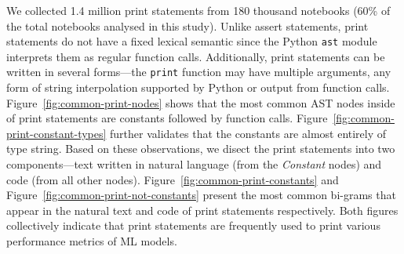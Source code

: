 We collected 1.4 million print statements from 180 thousand notebooks (60\% of the total notebooks analysed in this study). Unlike assert statements, print statements do not have a fixed lexical semantic since the Python \lstinline{ast} module interprets them as regular function calls. Additionally, print statements can be written in several forms---the \lstinline{print} function may have multiple arguments, any form of string interpolation supported by Python or output from function calls. Figure~\ref{fig:common-print-nodes} shows that the most common AST nodes inside of print statements are constants followed by function calls. Figure~\ref{fig:common-print-constant-types} further validates that the constants are almost entirely of type string. Based on these observations, we disect the print statements into two components---text written in natural language (from the \emph{Constant} nodes) and code (from all other nodes). Figure~\ref{fig:common-print-constants} and Figure~\ref{fig:common-print-not-constants} present the most common bi-grams that appear in the natural text and code of print statements respectively. Both figures collectively indicate that print statements are frequently used to print various performance metrics of ML models.

